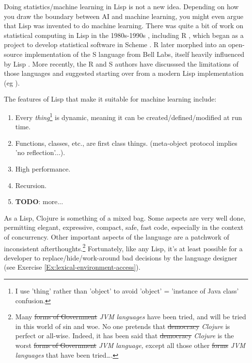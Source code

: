 \documentclass[11pt,openany,american,usenames,dvipsnames,svgnames,x11names,table,isodate]{article}
\numberwithin{equation}{section}
\numberwithin{figure}{section}
\begin{document}
Doing statistics/machine learning in Lisp is not a new idea. Depending
on how you draw the boundary between AI and machine learning, you
might even argue that Lisp was invented to do machine learning. There
was quite a bit of work on statistical computing in Lisp in the 1980s-1990s
\cite{donoho1983,mcdonald-pedersen-1988,oldford-peters-dinde-1988,Tierney-1990,Tierney-2005},
including R \cite{r-project}, which began as a project to develop
statistical software in Scheme \cite{ihaka-2010}. R later morphed
into an open-source implementation of the S language from Bell Labs,
itself heavily influenced by Lisp \cite{R:Becker+Chambers+Wilks:1988,R:Chambers+Hastie:1992,R:Chambers:1998}.
More recently, the R and S authors have discusssed the limitations
of those languages and suggested starting over from a modern Lisp
implementation (eg \cite{ihaka-lang-2008,Tierney-2005}).

The features of Lisp that make it suitable for machine learning include:
\begin{enumerate}
\item Every \emph{thing}\footnote{I use 'thing' rather than 'object' to avoid 'object' = 'instance of
Java class' confusion.}\emph{ }is dynamic, meaning it can be created/defined/modified at
run time. 
\item Functions, classes, etc., are first class things. (meta-object protocol
implies 'no reflection'...). 
\item High performance.
\item Recursion.
\item \textbf{TODO}: more...
\end{enumerate}
As a Lisp, Clojure \cite{emerick2011clojure,fogus2011clojure,halloway2009clojure,rathore2011clojure,vanderhart2009clojure}
is something of a mixed bag. Some aspects are very well done, permitting
elegant, expressive, compact, safe, fast code, especially in the context
of concurrency. Other important aspects of the language are a patchwork
of inconsistent afterthoughts.\footnote{Many \sout{forms of Government} \emph{JVM languages} have been
tried, and will be tried in this world of sin and woe. No one pretends
that \sout{democracy} \emph{Clojure} is perfect or all-wise. Indeed,
it has been said that \sout{democracy} \emph{Clojure} is the worst
\sout{forms of Government} \emph{JVM language,} except all those
other \sout{forms} \emph{JVM languages} that have been tried\ldots{}.\cite{churchill-democracy-1947}} Fortunately, like any Lisp, it's at least possible for a developer
to replace/hide/work-around bad decisions by the language designer
(see Exercise \ref{Ex:lexical-environment-access}).
\end{document}
